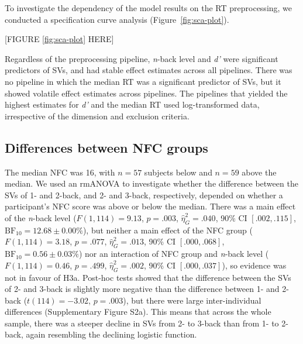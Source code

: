\documentclass[
  man,floatsintext]{apa6}
\begin{document}
To investigate the dependency of the model results on the RT preprocessing, we conducted a specification curve analysis (Figure~\ref{fig:sca-plot}).

{[}FIGURE \ref{fig:sca-plot} HERE{]}

Regardless of the preprocessing pipeline, \emph{n}-back level and \emph{d'} were significant predictors of SVs, and had stable effect estimates across all pipelines.
There was no pipeline in which the median RT was a significant predictor of SVs, but it showed volatile effect estimates across pipelines.
The pipelines that yielded the highest estimates for \emph{d'} and the median RT used log-transformed data, irrespective of the dimension and exclusion criteria.

\hypertarget{differences-between-nfc-groups}{%
\subsection{Differences between NFC groups}\label{differences-between-nfc-groups}}

The median NFC was 16, with \(n=57\) subjects below and \(n=59\) above the median.
We used an rmANOVA to investigate whether the difference between the SVs of 1- and 2-back, and 2- and 3-back, respectively, depended on whether a participant's NFC score was above or below the median.
There was a main effect of the \emph{n}-back level (\(F(1, 114) = 9.13\), \(p = .003\), \(\hat{\eta}^2_G = .040\), 90\% CI \([.002, .115]\), \(\mathrm{BF}_{\textrm{10}} = 12.68 \pm 0.00\%\)), but neither a main effect of the NFC group (\(F(1, 114) = 3.18\), \(p = .077\), \(\hat{\eta}^2_G = .013\), 90\% CI \([.000, .068]\), \(\mathrm{BF}_{\textrm{10}} = 0.56 \pm 0.03\%\)) nor an interaction of NFC group and \emph{n}-back level (\(F(1, 114) = 0.46\), \(p = .499\), \(\hat{\eta}^2_G = .002\), 90\% CI \([.000, .037]\)), so evidence was not in favour of H3a.
Post-hoc tests showed that the difference between the SVs of 2- and 3-back is slightly more negative than the difference between 1- and 2-back (\(t(114) = -3.02\), \(p = .003\)), but there were large inter-individual differences (Supplementary Figure S2a).
This means that across the whole sample, there was a steeper decline in SVs from 2- to 3-back than from 1- to 2-back, again resembling the declining logistic function.
\end{document}
